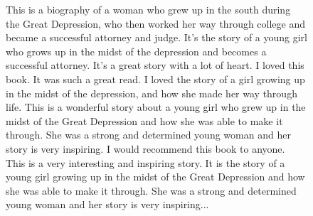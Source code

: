 \documentclass[12pt]{article}
\begin{document}
\begin{figure}[!htb]
\begin{minipage}[t]{.4\textwidth}
{This is a biography of a woman who grew up in the south during the Great Depression, who then worked her way through college and became a successful attorney and judge.
It's the story of a young girl who grows up in the midst of the depression and becomes a successful attorney. It's a great story with a lot of heart.
I loved this book. It was such a great read. I loved the story of a girl growing up in the midst of the depression, and how she made her way through life.
This is a wonderful story about a young girl who grew up in the midst of the Great Depression and how she was able to make it through. She was a strong and determined young woman and her story is very inspiring. I would recommend this book to anyone.
This is a very interesting and inspiring story. It is the story of a young girl growing up in the midst of the Great Depression and how she was able to make it through. She was a strong and determined young woman and her story is very inspiring...}
\end{minipage}
\end{figure}
\pagebreak
\end{document}

